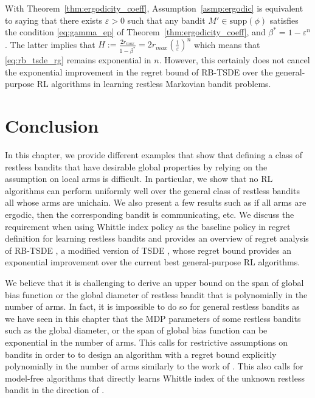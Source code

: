 With Theorem~\ref{thm:ergodicity_coeff}, Assumption~\ref{asmp:ergodic} is equivalent to saying that there exists $\varepsilon>0$ such that any bandit $M'\in\mathrm{supp}(\phi)$ satisfies the condition \eqref{eq:gamma_ep} of Theorem~\ref{thm:ergodicity_coeff}, and $\beta^*=1-\varepsilon^n$.
The latter implies that $H:=\displaystyle\frac{2r_{max}}{1-\beta^*}=\displaystyle2r_{max}\left(\frac{1}{\varepsilon}\right)^n$ which means that \eqref{eq:rb_tsde_rg} remains exponential in $n$.
However, this certainly does not cancel the exponential improvement in the regret bound of RB-TSDE \cite{akbarzadeh2022learning} over the general-purpose RL algorithms in learning restless Markovian bandit problems.

\section{Conclusion}
\label{ch:restless:sec:conclude}

In this chapter, we provide different examples that show that defining a class of restless bandits that have desirable global properties by relying on the assumption on local arms is difficult.
In particular, we show that no RL algorithms can perform uniformly well over the general class of restless bandits all whose arms are unichain.
We also present a few results such as if all arms are ergodic, then the corresponding bandit is communicating, etc.
We discuss the requirement when using Whittle index policy as the baseline policy in regret definition for learning restless bandits and provides an overview of regret analysis of RB-TSDE \cite{akbarzadeh2022learning}, a modified version of TSDE \cite{ouyang2017learning}, whose regret bound provides an exponential improvement over the current best general-purpose RL algorithms.

We believe that it is challenging to derive an upper bound on the span of global bias function or the global diameter of restless bandit that is polynomially in the number of arms.
In fact, it is impossible to do so for general restless bandits as we have seen in this chapter that the MDP parameters of some restless bandits such as the global diameter, or the span of global bias function can be exponential in the number of arms.
This calls for restrictive assumptions on bandits in order to to design an algorithm with a regret bound explicitly polynomially in the number of arms similarly to the work of \cite{wang2020restless}.
This also calls for model-free algorithms that directly learns Whittle index of the unknown restless bandit in the direction of \cite{fu2019towards, gibson2021novel, nakhleh2021neurwin, avrachenkov2022whittle}.

